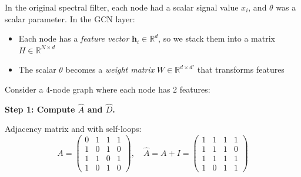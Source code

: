 \begin{notechapter}
\begin{remark}
In the original spectral filter, each node had a scalar signal value 
$x_i$, and $\theta$ was a scalar parameter. In the GCN layer:
\begin{itemize}
    \item Each node has a \emph{feature vector} $\mathbf{h}_i \in \mathbb{R}^d$, 
          so we stack them into a matrix $H \in \mathbb{R}^{N \times d}$
    \item The scalar $\theta$ becomes a \emph{weight matrix} 
          $W \in \mathbb{R}^{d \times d'}$ that transforms features
\end{itemize}
\end{remark}

\begin{example}
Consider a 4-node graph where each node has 2 features:

\begin{center}
\end{center}

\textbf{Step 1: Compute $\hat{A}$ and $\hat{D}$.}

Adjacency matrix and with self-loops:
\[
A = \begin{pmatrix} 
0 & 1 & 1 & 1 \\ 
1 & 0 & 1 & 0 \\ 
1 & 1 & 0 & 1 \\ 
1 & 0 & 1 & 0 
\end{pmatrix}, \quad
\hat{A} = A + I = \begin{pmatrix} 
1 & 1 & 1 & 1 \\ 
1 & 1 & 1 & 0 \\ 
1 & 1 & 1 & 1 \\ 
1 & 0 & 1 & 1 
\end{pmatrix}
\]


\end{example}
\end{notechapter}
